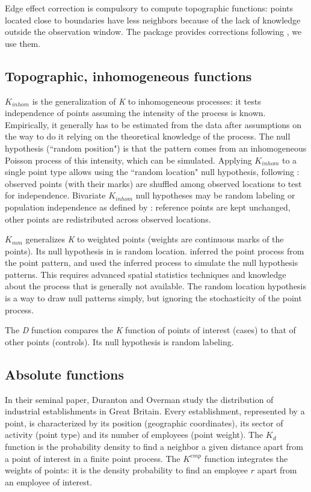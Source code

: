 \documentclass[nojss]{jss}
\begin{document}
Edge effect correction is compulsory to compute topographic functions: points located close to boundaries have less neighbors because of the lack of knowledge outside the observation window. The  package provides corrections following \cite{Ripley1988}, we use them.


\subsection{Topographic, inhomogeneous functions}
$K_{inhom}$ \citep{Baddeley2000} is the generalization of \emph{K} to inhomogeneous processes: it tests independence of points assuming the intensity of the process is known. Empirically, it generally has to be estimated from the data after assumptions on the way to do it relying on the theoretical knowledge of the process. The null hypothesis (``random position") is that the pattern comes from an inhomogeneous Poisson process of this intensity, which can be simulated. Applying $K_{inhom}$ to a single point type allows using the ``random location" null hypothesis, following \cite{Duranton2005}: observed points (with their marks) are shuffled among observed locations to test for independence. Bivariate $K_{inhom}$ null hypotheses may be random labeling or population independence as defined by \cite{Marcon2010}: reference points are kept unchanged, other points are redistributed across observed locations.

$K_{mm}$ \citep{Penttinen2006, Penttinen1992} generalizes \emph{K} to weighted points (weights are continuous marks of the points). Its null hypothesis in  is random location. \cite{Penttinen1992} inferred the point process from the point pattern, and used the inferred process to simulate the null hypothesis patterns. This requires advanced spatial statistics techniques and knowledge about the process that is generally not available. The random location hypothesis is a way to draw null patterns simply, but ignoring the stochasticity of the point process.

The \emph{D} \citep{Diggle1991} function compares the \emph{K} function of points of interest (cases) to that of other points (controls). Its null hypothesis is random labeling.


\subsection{Absolute functions}\label{Absolute}
In their seminal paper, Duranton and Overman \citep{Duranton2005} study the distribution of industrial establishments in Great Britain.
Every establishment, represented by a point, is characterized by its position (geographic coordinates), its sector of activity (point type) and its number of employees (point weight).
The $K_d$ function \citep{Duranton2005} is the probability density to find a neighbor a given distance apart from a point of interest in a finite point process.
The $K^{emp}$ function integrates the weights of points: it is the density probability to find an employee $r$ apart from an employee of interest.
\end{document}
